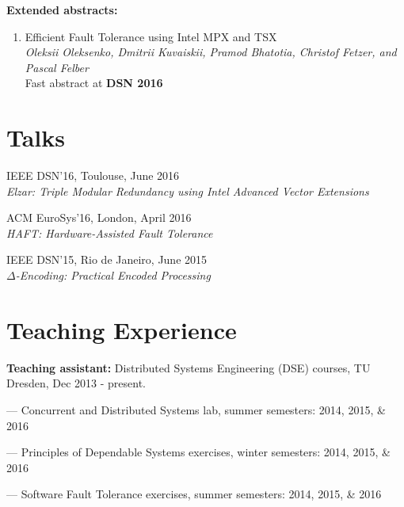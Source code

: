 \documentclass[letterpaper]{article}
\renewenvironment{itemize}{
  \begin{list}{}{
    \setlength{\leftmargin}{1.5em}
  }
}{
  \end{list}
}
\begin{document}
{\bf Extended abstracts:}

\begin{enumerate} [label= $\lbrack$\arabic*$\rbrack$, resume]

\item{Efficient Fault Tolerance using Intel MPX and TSX}\\
{\em Oleksii Oleksenko, {Dmitrii Kuvaiskii}, Pramod Bhatotia, Christof Fetzer, and Pascal Felber}\\
Fast abstract at {\bf DSN 2016}


\end{enumerate}


\section*{Talks}
\begin{itemize}
\item IEEE DSN'16, Toulouse, June 2016\\
	{\em  Elzar: Triple Modular Redundancy using Intel Advanced Vector Extensions}

\item ACM EuroSys'16, London, April 2016\\
	{\em  HAFT: Hardware-Assisted Fault Tolerance}
	
\item IEEE DSN'15, Rio de Janeiro, June 2015\\
{\em  $\Delta$-Encoding: Practical Encoded Processing}
\end{itemize}


\section*{Teaching Experience}

\begin{itemize}
\item {\bf Teaching assistant:} Distributed Systems Engineering (DSE) courses, TU Dresden, Dec 2013 - present.
\begin{itemize}
	\item --- Concurrent and Distributed Systems lab, summer semesters: 2014, 2015, \& 2016
	\item --- Principles of Dependable Systems exercises, winter semesters: 2014, 2015, \& 2016
	\item --- Software Fault Tolerance exercises, summer semesters: 2014, 2015, \& 2016
\end{itemize}
\end{itemize}
\end{document}
